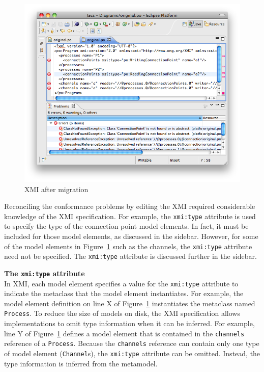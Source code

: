 \begin{figure}[htbp]
	\centering
	\includegraphics[width=13.5cm]{6.Evaluation/images/user_driven/po_migrated_xmi.png}
	\caption{XMI after migration}
	\label{fig:po_migrated_xmi}
\end{figure}

Reconciling the conformance problems by editing the XMI required considerable knowledge of the XMI specification. For example, the \texttt{xmi:type} attribute is used to specify the type of the connection point model elements. In fact, it must be included for those model elements, as discussed in the sidebar. However, for some of the model elements in Figure~\ref{fig:po_migrated_xmi} such as the channels, the \texttt{xmi:type} attribute need not be specified. The \texttt{xmi:type} attribute is discussed further in the sidebar.

\begin{framed}
\textbf{The \texttt{xmi:type} attribute} \\
In XMI, each model element specifies a value for the \texttt{xmi:type} attribute to indicate the metaclass that the model element instantiates. For example, the model element definition on line X of Figure~\ref{fig:po_migrated_xmi} instantiates the metaclass named \texttt{Process}. To reduce the size of models on disk, the XMI specification allows implementations to omit type information when it can be inferred. For example, line Y of Figure~\ref{fig:po_migrated_xmi} defines a model element that is contained in the \texttt{channels} reference of a \texttt{Process}. Because the \texttt{channels} reference can contain only one type of model element (\texttt{Channel}s), the \texttt{xmi:type} attribute can be omitted. Instead, the type information is inferred from the metamodel.
\end{framed}

